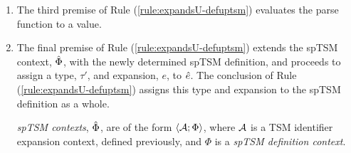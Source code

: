 {{{{\begin{enumerate}
\begingroup
\def\thetheorem{\ref{condition:proto-pattern-isomorphism}}
\begin{condition} ~
\begin{enumerate}
\item For every $\cpv$, we have $\encodeCEPat{\cpv}{\ecand}$ for some $\ecand$ such that $\hastypeUC{\ecand}{\tCEPat}$ and $\isvalU{\ecand}$.
\item If $\hastypeUC{\ecand}{\tCEPat}$ and $\isvalU{\ecand}$ then $\decodeCEPat{\ecand}{\cpv}$ for some $\cpv$.
\item If $\encodeCEPat{\cpv}{\ecand}$ then $\decodeCEPat{\ecand}{\cpv}$.
\item If $\hastypeUC{\ecand}{\tCEPat}$ and $\isvalU{\ecand}$ and $\decodeCEPat{\ecand}{\cpv}$ then $\encodeCEPat{\cpv}{\ecand}$.
\item If $\encodeCEPat{\cpv}{\ecand}$ and $\encodeCEPat{\cpv}{\ecand'}$ then $\ecand=\ecand'$.
\item If $\hastypeUC{\ecand}{\tCEPat}$ and $\isvalU{\ecand}$ and $\decodeCEPat{\ecand}{\cpv}$ and $\decodeCEPat{\ecand}{\cpv'}$ then $\cpv=\cpv'$.
\end{enumerate}
\end{condition}
\endgroup

\item The third premise of Rule (\ref{rule:expandsU-defuptsm}) evaluates the parse function to a value.
\item The final premise of Rule (\ref{rule:expandsU-defuptsm}) extends the spTSM context, $\hat\Phi$, with the newly determined {spTSM definition}, and proceeds to assign a type, $\tau'$, and expansion, $e$, to ${\hat e}$. The conclusion of Rule (\ref{rule:expandsU-defuptsm}) assigns this type and expansion to the spTSM definition as a whole.%



\emph{spTSM contexts}, $\hat\Phi$, are of the form $\langle \mathcal{A}; \Phi \rangle$, where $\mathcal{A}$ is a {TSM identifier expansion context}, defined previously, and $\Phi$ is a \emph{spTSM definition context}. 



\end{enumerate}}}}}

